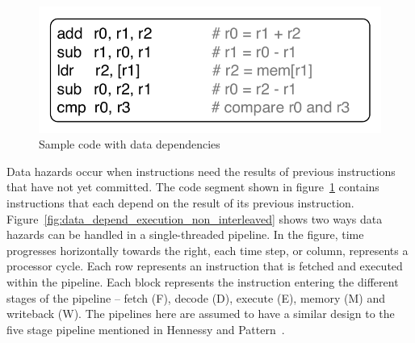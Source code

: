 \begin{figure}
  \vspace{-20pt}
  \begin{center}
    \includegraphics[scale=.65]{figs/sample_data_dependent_code}
  \end{center}
  \vspace{-20pt}
  \caption{Sample code with data dependencies}
  \label{fig:sample_data_dependent_code}
\end{figure}
Data hazards occur when instructions need the results of previous instructions that have not yet committed.
The code segment shown in figure~\ref{fig:sample_data_dependent_code} contains instructions that each depend on the result of its previous instruction.
Figure~\ref{fig:data_depend_execution_non_interleaved} shows two ways data hazards can be handled in a single-threaded pipeline. 
In the figure, time progresses horizontally towards the right, each time step, or column, represents a processor cycle.
Each row represents an instruction that is fetched and executed within the pipeline.
Each block represents the instruction entering the different stages of the pipeline -- fetch (F), decode (D), execute (E), memory (M) and writeback (W).   
The pipelines here are assumed to have a similar design to the five stage pipeline mentioned in Hennessy and Pattern~.

